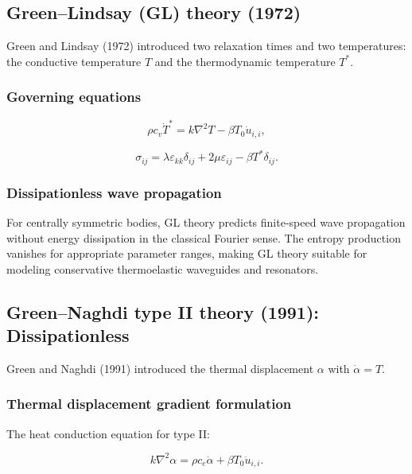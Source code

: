 \subsection{Green--Lindsay (GL) theory (1972)}
\label{sec:4.4}

Green and Lindsay (1972) introduced two relaxation times and two temperatures: the conductive temperature $T$ and the thermodynamic temperature $T^*$.

\subsubsection{Governing equations}

\begin{equation}
\rho c_v \dot{T}^* = k\nabla^2 T - \beta T_0 \dot{u}_{i,i},
\label{eq:4.9}
\end{equation}

\begin{equation}
\sigma_{ij} = \lambda\varepsilon_{kk}\delta_{ij} + 2\mu\varepsilon_{ij} - \beta T^*\delta_{ij}.
\label{eq:4.10}
\end{equation}

\subsubsection{Dissipationless wave propagation}

For centrally symmetric bodies, GL theory predicts finite-speed wave propagation without energy dissipation in the classical Fourier sense. The entropy production vanishes for appropriate parameter ranges, making GL theory suitable for modeling conservative thermoelastic waveguides and resonators.

\subsection{Green--Naghdi type II theory (1991): Dissipationless}
\label{sec:4.5}

Green and Naghdi (1991) introduced the thermal displacement $\alpha$ with $\dot{\alpha} = T$.

\subsubsection{Thermal displacement gradient formulation}

The heat conduction equation for type II:

\begin{equation}
k\nabla^2\alpha = \rho c_e \ddot{\alpha} + \beta T_0 \ddot{u}_{i,i}.
\label{eq:4.11}
\end{equation}

